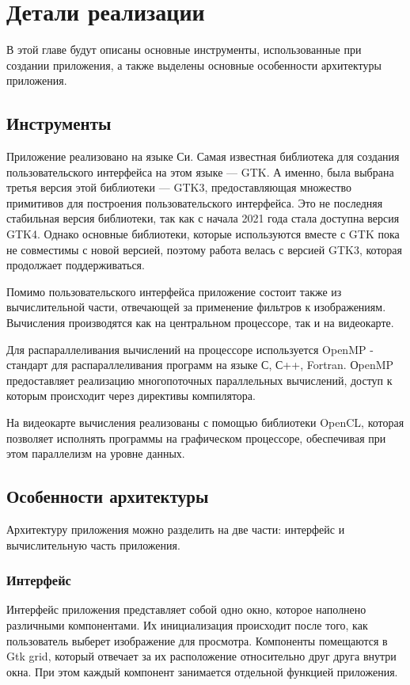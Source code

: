 \section{Детали реализации}
В этой главе будут описаны основные инструменты, использованные при создании приложения, а также выделены основные особенности 
архитектуры приложения.

\subsection{Инструменты}
Приложение реализовано на языке Си. Самая известная библиотека для создания пользовательского интерфейса на этом языке --- GTK. 
А именно, была выбрана третья версия этой библиотеки --- GTK3\cite{gtk3}, предоставляющая множество примитивов для построения 
пользовательского интерфейса. Это не последняя стабильная версия библиотеки, так как с начала 2021 года стала доступна версия GTK4. 
Однако основные библиотеки, которые используются вместе с GTK пока не совместимы с новой версией, поэтому работа велась с версией GTK3, 
которая продолжает поддерживаться.

Помимо пользовательского интерфейса приложение состоит также из вычислительной части, отвечающей за применение фильтров к изображениям. 
Вычисления производятся как на центральном процессоре, так и на видеокарте.

Для распараллеливания вычислений на процессоре используется OpenMP\cite{openmp} - стандарт для распараллеливания программ на языке С, 
С++, Fortran. ОpenMP предоставляет реализацию многопоточных параллельных вычислений, доступ к которым происходит через директивы компилятора.

На видеокарте вычисления реализованы с помощью библиотеки OpenCL\cite{opencl}, которая позволяет исполнять программы на графическом 
процессоре, обеспечивая при этом параллелизм на уровне данных.

\subsection{Особенности архитектуры}
Архитектуру приложения можно разделить на две части: интерфейс и вычислительную часть приложения.

\subsubsection{Интерфейс}
Интерфейс приложения представляет собой одно окно, которое наполнено различными компонентами. Их инициализация происходит после того, 
как пользователь выберет изображение для просмотра. Компоненты помещаются в Gtk grid, который отвечает за их расположение относительно 
друг друга внутри окна. При этом каждый компонент занимается отдельной функцией приложения.

